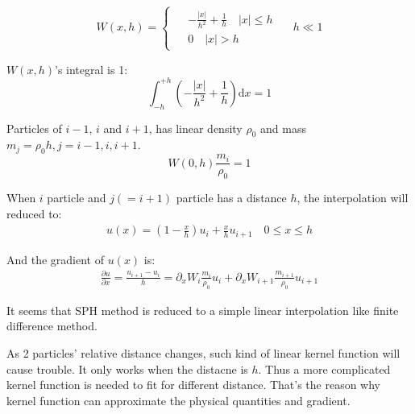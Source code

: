 \begin{equation}
    W(x,h)=
    \begin{cases}
        \begin{aligned}
            &-\frac{|x|}{h^2}+\frac{1}{h}\quad |x| \leq h \\
            &0 \quad |x| > h
        \end{aligned}
    \end{cases}
    \quad h \ll 1
\end{equation}

$W(x,h)$'s integral is 1:
\begin{equation}
    \int_{-h}^{+h} \left(-\frac{|x|}{h^2}+\frac{1}{h}\right)\mathrm{d}x = 1
\end{equation}

Particles of $i-1$, $i$ and $i+1$, has linear density $\rho_0$ and mass 
$m_j = \rho_0 h, j=i-1,i,i+1$.
\begin{equation}
    W(0,h)\frac{m_i}{\rho_0} = 1
\end{equation}

When $i$ particle and $j(=i+1)$ particle has a distance $h$, 
the interpolation will reduced to:
\begin{equation}
    \begin{aligned}
        u(x) = \left(1-\frac{x}{h}\right)u_i + \frac{x}{h}u_{i+1}\quad 
        0\leq x \leq h
    \end{aligned}
\end{equation}

And the gradient of $u(x)$ is:
\begin{equation}
    \begin{aligned}
        \frac{\partial u}{\partial x} = \frac{u_{i+1}-u_i}{h}
        =
        \partial_x W_i\frac{m_i}{\rho_0} u_i + \partial_x W_{i+1}\frac{m_{i+1}}{\rho_0} u_{i+1}
    \end{aligned}
\end{equation}

It seems that SPH method is reduced to a simple linear interpolation like finite difference method.

As 2 particles' relative distance changes, 
such kind of linear kernel function will cause trouble. 
It only works when the distacne is $h$. 
Thus
a more complicated kernel function is needed to fit for different distance.
That's the reason why kernel function can approximate the physical quantities and gradient.